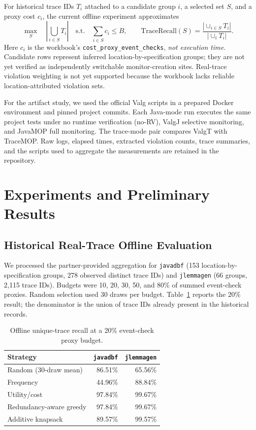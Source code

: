 \documentclass[10pt,letterpaper]{article}
\begin{document}
For historical trace IDs $T_i$ attached to a candidate group $i$, a selected set
$S$, and a proxy cost $c_i$, the current offline experiment approximates
\begin{equation}
  \max_{S}\quad \left|\bigcup_{i\in S}T_i\right|
  \quad \text{s.t.}\quad \sum_{i\in S}c_i\le B,
  \qquad
  \mathrm{TraceRecall}(S)=
  \frac{|\cup_{i\in S}T_i|}{|\cup_iT_i|}.
\end{equation}
Here $c_i$ is the workbook's \texttt{cost\_proxy\_event\_checks}, \emph{not
execution time}. Candidate rows represent inferred location-by-specification
groups; they are not yet verified as independently switchable monitor-creation
sites. Real-trace violation weighting is not yet supported because the workbook
lacks reliable location-attributed violation sets.

For the artifact study, we used the official Valg scripts in a prepared Docker
environment and pinned project commits. Each Java-mode run executes the same
project tests under no runtime verification (no-RV), ValgJ selective monitoring,
and JavaMOP full monitoring. The trace-mode pair compares ValgT with TraceMOP.
Raw logs, elapsed times, extracted violation counts, trace summaries, and the
scripts used to aggregate the measurements are retained in the repository.

\section{Experiments and Preliminary Results}

\subsection{Historical Real-Trace Offline Evaluation}

We processed the partner-provided aggregation for \texttt{javadbf} (153
location-by-specification groups, 278 observed distinct trace IDs) and
\texttt{jlemmagen} (66 groups, 2,115 trace IDs). Budgets were 10, 20, 30, 50, and
80\% of summed event-check proxies. Random selection used 30 draws per budget.
Table~\ref{tab:offline} reports the 20\% result; the denominator is the union of
trace IDs already present in the historical records.

\begin{table}[ht]
  \centering
  \small
  \caption{Offline unique-trace recall at a 20\% event-check proxy budget.}
  \label{tab:offline}
  \begin{tabular}{lrr}
    \toprule
    Strategy & \texttt{javadbf} & \texttt{jlemmagen} \\
    \midrule
    Random (30-draw mean) & 86.51\% & 65.56\% \\
    Frequency & 44.96\% & 88.84\% \\
    Utility/cost & 97.84\% & 99.67\% \\
    Redundancy-aware greedy & 97.84\% & 99.67\% \\
    Additive knapsack & 89.57\% & 99.57\% \\
    \bottomrule
  \end{tabular}
\end{table}
\end{document}
